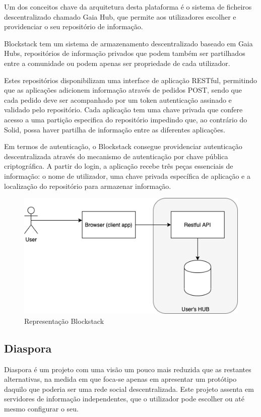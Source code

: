 Um dos conceitos chave da arquitetura desta plataforma é o sistema de ficheiros descentralizado chamado Gaia Hub, que permite aos utilizadores escolher e providenciar o seu repositório de informação.

Blockstack tem um sistema de armazenamento descentralizado baseado em Gaia Hubs, repositórios de informação privados que podem também ser partilhados entre a comunidade ou podem apenas ser propriedade de cada utilizador. 

Estes repositórios disponibilizam uma interface de aplicação RESTful, permitindo que as aplicações adicionem informação através de pedidos POST, sendo que cada pedido deve ser acompanhado por um token autenticação assinado e validado pelo repositório. Cada aplicação tem uma chave privada que confere acesso a uma partição especifica do repositório impedindo que, ao contrário do Solid, possa haver partilha de informação entre as diferentes aplicações.\cite{blockstack_white_paper}

Em termos de autenticação, o Blockstack consegue providenciar autenticação descentralizada através do mecanismo de autenticação por chave pública criptográfica. A partir do login, a aplicação recebe três peças essenciais de informação: o nome de utilizador, uma chave privada específica de aplicação e a localização do repositório para armazenar informação.\cite{blockstack_white_paper}

\begin{figure}[h]
    \begin{center}
    \includegraphics[width=1\textwidth]{figures/estado_arte-Blockstack.png}
    \caption{Representação Blockstack}
    \end{center}
\end{figure}

\subsection{Diaspora}
Diaspora é um projeto com uma visão um pouco mais reduzida que as restantes alternativas, na medida em que foca-se apenas em apresentar um protótipo daquilo que poderia ser uma rede social descentralizada. Este projeto assenta em servidores de informação independentes, que o utilizador pode escolher ou até mesmo configurar o seu. \cite{diaspora_wiki}


